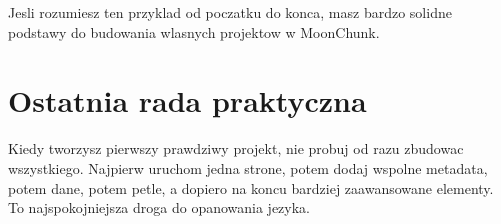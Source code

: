 Jesli rozumiesz ten przyklad od poczatku do konca, masz bardzo solidne podstawy do
budowania wlasnych projektow w MoonChunk.

\section{Ostatnia rada praktyczna}
Kiedy tworzysz pierwszy prawdziwy projekt, nie probuj od razu zbudowac wszystkiego.
Najpierw uruchom jedna strone, potem dodaj wspolne metadata, potem dane, potem petle,
a dopiero na koncu bardziej zaawansowane elementy. To najspokojniejsza droga do
opanowania jezyka.
